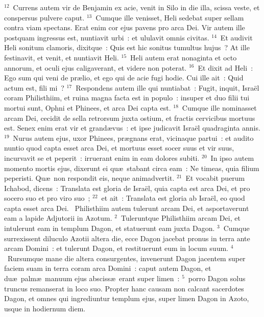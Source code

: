 ${}^{12}$~Currens autem vir de Benjamin ex acie, venit in Silo in die illa, scissa veste, et conspersus pulvere caput.
${}^{13}$~Cumque ille venisset, Heli sedebat super sellam contra viam spectans. Erat enim cor ejus pavens pro arca Dei. Vir autem ille postquam ingressus est, nuntiavit urbi~: et ululavit omnis civitas.
${}^{14}$~Et audivit Heli sonitum clamoris, dixitque~: Quis est hic sonitus tumultus hujus~? At ille festinavit, et venit, et nuntiavit Heli.
${}^{15}$~Heli autem erat nonaginta et octo annorum, et oculi ejus caligaverant, et videre non poterat.
${}^{16}$~Et dixit ad Heli~: Ego sum qui veni de pr\ae lio, et ego qui de acie fugi hodie. Cui ille ait~: Quid actum est, fili mi~?
${}^{17}$~Respondens autem ille qui nuntiabat~: Fugit, inquit, Isra\"el coram Philisthiim, et ruina magna facta est in populo~: insuper et duo filii tui mortui sunt, Ophni et Phinees, et arca Dei capta est.
${}^{18}$~Cumque ille nominasset arcam Dei, cecidit de sella retrorsum juxta ostium, et fractis cervicibus mortuus est. Senex enim erat vir et grand\ae vus~: et ipse judicavit Isra\"el quadraginta annis.
${}^{19}$~Nurus autem ejus, uxor Phinees, pr\ae gnans erat, vicinaque partui~: et audito nuntio quod capta esset arca Dei, et mortuus esset socer suus et vir suus, incurvavit se et peperit~: irruerant enim in eam dolores subiti.
${}^{20}$~In ipso autem momento mortis ejus, dixerunt ei qu\ae\ stabant circa eam~: Ne timeas, quia filium peperisti. Qu\ae\ non respondit eis, neque animadvertit.
${}^{21}$~Et vocabit puerum Ichabod, dicens~: Translata est gloria de Isra\"el, quia capta est arca Dei, et pro socero suo et pro viro suo~;
${}^{22}$~et ait~: Translata est gloria ab Isra\"el, eo quod capta esset arca Dei.
~\lettrine[lines=10,image=true,loversize=0.05,lraise=-0.03]{P}{}hilisthiim autem tulerunt arcam Dei, et asportaverunt eam a lapide Adjutorii in Azotum.
${}^{2}$~Tuleruntque Philisthiim arcam Dei, et intulerunt eam in templum Dagon, et statuerunt eam juxta Dagon.
${}^{3}$~Cumque surrexissent diluculo Azotii altera die, ecce Dagon jacebat pronus in terra ante arcam Domini~: et tulerunt Dagon, et restituerunt eum in locum suum.
${}^{4}$~Rursumque mane die altera consurgentes, invenerunt Dagon jacentem super faciem suam in terra coram arca Domini~: caput autem Dagon, et du\ae\ palm\ae\ manuum ejus absciss\ae\ erant super limen~:
${}^{5}$~porro Dagon solus truncus remanserat in loco suo. Propter hanc causam non calcant sacerdotes Dagon, et omnes qui ingrediuntur templum ejus, super limen Dagon in Azoto, usque in hodiernum diem.

